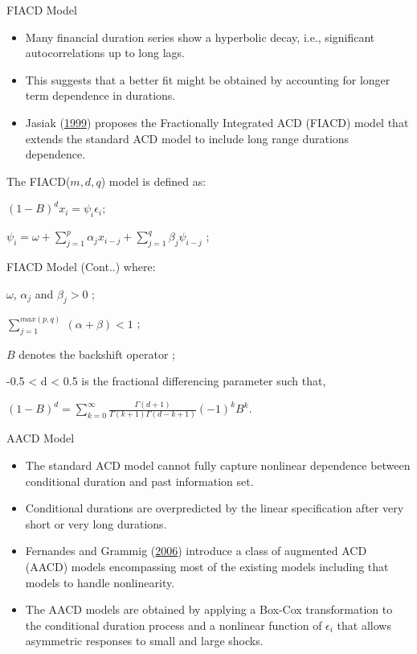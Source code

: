 \documentclass[
  ignorenonframetext,
]{beamer}
\begin{document}
\begin{frame}{FIACD Model}
\protect\hypertarget{fiacd-model}{}
\begin{itemize}
\item
  Many financial duration series show a hyperbolic decay, i.e.,
  significant autocorrelations up to long lags.
\item
  This suggests that a better fit might be obtained by accounting for
  longer term dependence in durations.
\item
  Jasiak (\protect\hyperlink{ref-FIACD}{1999}) proposes the Fractionally
  Integrated ACD (FIACD) model that extends the standard ACD model to
  include long range durations dependence.
\end{itemize}

The FIACD(\(m, d, q\)) model is defined as:

\((1-B)^dx_i = \psi_i \epsilon_i\);

\(\psi_i = \omega + \sum_{j=1}^p \alpha_j x_{i-j} + \sum_{j=1}^q \beta_j \psi_{i-j}\)
;
\end{frame}

\begin{frame}{FIACD Model (Cont..)}
\protect\hypertarget{fiacd-model-cont..}{}
where:

\(\omega\), \(\alpha_j\) and \(\beta_j > 0\) ;

\(\sum_{j=1}^{max(p,q)}\ (\alpha + \beta) < 1\) ;

\(B\) denotes the backshift operator ;

-0.5 \textless{} d \textless{} 0.5 is the fractional differencing
parameter such that,

\((1-B)^d=\sum_{k=0}^{\infty}\frac{\Gamma(d+1)}{\Gamma(k+1)\Gamma(d-k+1)}(-1)^kB^k\).
\end{frame}

\begin{frame}{AACD Model}
\protect\hypertarget{aacd-model}{}
\begin{itemize}
\item
  The standard ACD model cannot fully capture nonlinear dependence
  between conditional duration and past information set.
\item
  Conditional durations are overpredicted by the linear specification
  after very short or very long durations.
\item
  Fernandes and Grammig (\protect\hyperlink{ref-AACD}{2006}) introduce a
  class of augmented ACD (AACD) models encompassing most of the existing
  models including that models to handle nonlinearity.
\item
  The AACD models are obtained by applying a Box-Cox transformation to
  the conditional duration process and a nonlinear function of
  \(\epsilon_i\) that allows asymmetric responses to small and large
  shocks.
\end{itemize}
\end{frame}
\end{document}
